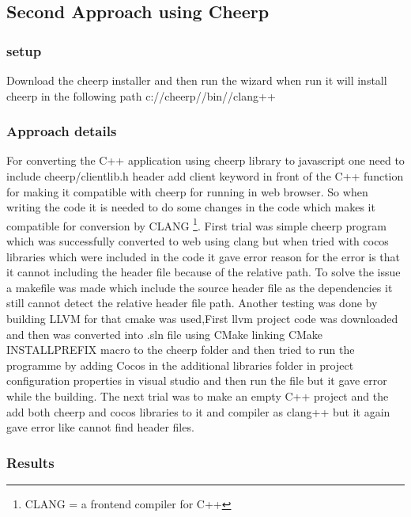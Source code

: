 \documentclass[23pt]{article}
\begin{document}
\subsection{Second Approach using Cheerp}

\subsubsection{setup}

{\Large Download the cheerp installer and then run the wizard when run it will install cheerp in the following path c://cheerp//bin//clang++ \par}

\subsubsection{Approach details}

{\Large For converting the C++ application using cheerp library to javascript one need to include cheerp/clientlib.h header add client keyword in front of the C++ function for making it compatible with cheerp for running in web browser. So when writing the code it is needed to do some changes in the code which makes it compatible for conversion by CLANG \footnote{CLANG = a frontend compiler for C++}. First trial was simple cheerp program which was successfully converted to web using clang but when tried with cocos libraries which were included in the code  it gave error reason for the error is that it cannot including the header file because of the relative path. To solve the issue a makefile was made which include the source header file as the dependencies it still cannot detect the relative header file path. Another testing was done by building LLVM for that cmake was used,First llvm project code was downloaded  and then was converted into .sln file using CMake linking CMake INSTALL\textunderscore PREFIX macro to the cheerp folder and then tried to run the programme by adding Cocos in the additional libraries folder in project configuration properties in visual studio and then run the file but it gave error while the building. The next trial was to make an empty C++ project and the add both cheerp and cocos libraries to it and compiler as clang++ but it again gave error like cannot find header files. \cite{cheerpsetup} \par}


\subsubsection{Results}
\end{document}
